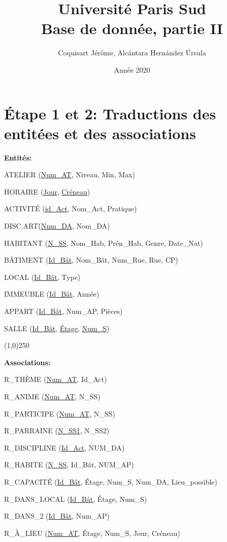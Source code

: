 \documentclass[a4paper,10.5pt]{report}
\title{\textbf{\Huge  Université Paris Sud}\\ Base de donnée, partie II}
\author{Coquisart Jérôme, Alcántara Hernández Úrsula}
\date{Année 2020}
\begin{document}
    \maketitle
    \newpage
    \newpage

    \section*{Étape 1 et 2: Traductions des entitées et des associations}


	\textbf{Entités:}
	
	ATELIER (\underline{Num\_AT}, Niveau, Min, Max)

	HORAIRE (\underline{Jour}, \underline{Créneau})

	ACTIVITÉ (\underline{id\_Act}, Nom\_Act, Pratique) 

	DISC.ART\. (\underline{Num\_DA}, Nom\_DA)

	HABITANT (\underline{N\_SS}, Nom\_Hab, Prén\_Hab, Genre, Date\_Nat)

	BÂTIMENT (\underline{Id\_Bât}, Nom\_Bât, Num\_Rue, Rue, CP)

	LOCAL (\underline{Id\_Bât}, Type)

	IMMEUBLE (\underline{Id\_Bât}, Année)

	APPART (\underline{Id\_Bât}, Num\_AP, Pièces)

	SALLE (\underline{Id\_Bât}, \underline{Étage}, \underline{Num\_S})
	
	\begin{center}
	\line(1,0){250}
	\end{center}

	\textbf{Associations:}
	
	R\_THÈME (\underline{Num\_AT}, Id\_Act)

	R\_ANIME (\underline{Num\_AT}, N\_SS)

	R\_PARTICIPE (\underline{Num\_AT}, N\_SS)

	R\_PARRAINE (\underline{N\_SS1}, N\_SS2)

	R\_DISCIPLINE (\underline{Id\_Act}, NUM\_DA)

	R\_HABITE (\underline{N\_SS}, Id\_Bât, NUM\_AP)

	R\_CAPACITÉ (\underline{Id\_Bât}, Étage, Num\_S, Num\_DA, Lieu\_possible)

	R\_DANS\_LOCAL (\underline{Id\_Bât}, Étage, Num\_S)

	R\_DANS\_2 (\underline{Id\_Bât}, Num\_AP)

	R\_À\_LIEU (\underline{Num\_AT}, Étage, Num\_S, Jour, Créneau)
\end{document}
